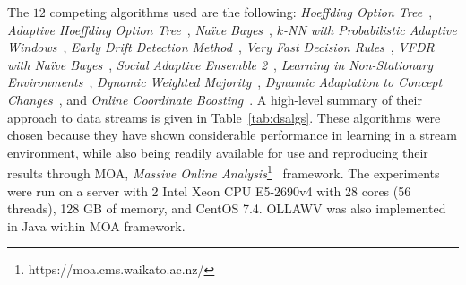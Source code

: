 \documentclass[reqno]{vcuthesis}
\numberwithin{equation}{chapter}
\begin{document}
The $12$ competing algorithms used are the following: \textit{Hoeffding Option Tree}~\cite{pfahringer2007new}, \textit{Adaptive Hoeffding Option Tree}~\cite{pfahringer2007new}, \textit{Na\"{i}ve Bayes}~\cite{john1995estimating}, \textit{$k$-NN with Probabilistic Adaptive Windows}~\cite{bifet2013efficient}, \textit{Early Drift Detection Method}~\cite{baena2006early}, \textit{Very Fast Decision Rules}~\cite{gama2011learning}, \textit{VFDR with Na\"{i}ve Bayes}~\cite{gama2011learning}, \textit{Social Adaptive Ensemble 2}~\cite{gomes2014sae2}, \textit{Learning in Non-Stationary Environments}~\cite{elwell2011incremental}, \textit{Dynamic Weighted Majority}~\cite{kolter2007dynamic}, \textit{Dynamic Adaptation to Concept Changes}~\cite{jaber2013new}, and \textit{Online Coordinate Boosting}~\cite{pelossof2009online}. A high-level summary of their approach to data streams is given in Table~\ref{tab:dsalgs}. These algorithms were chosen because they have shown considerable performance in learning in a stream environment, while also being readily available for use and reproducing their results through MOA, \textit{Massive Online Analysis}\footnote{https://moa.cms.waikato.ac.nz/}~\cite{moacite} framework. The experiments were run on a server with 2 Intel Xeon CPU E5-2690v4 with 28 cores (56 threads), 128 GB of memory, and CentOS 7.4. OLLAWV was also implemented in Java within MOA framework. 
\end{document}
